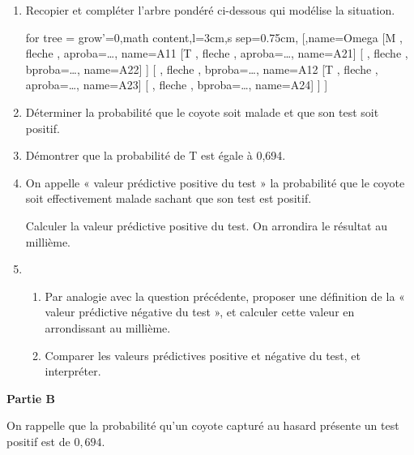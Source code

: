 \begin{enumerate}
	\item Recopier et compléter l’arbre pondéré ci-dessous qui modélise la situation.
	
	\begin{center}
		\begin{forest} for tree = {grow'=0,math content,l=3cm,s sep=0.75cm},
			[,name=Omega
				[M , fleche , aproba=\ldots , name=A11
					[T , fleche , aproba=\ldots , name=A21]
					[ , fleche , bproba=\ldots , name=A22]
				]
				[ , fleche , bproba=\ldots , name=A12
					[T , fleche , aproba=\ldots , name=A23]
					[ , fleche , bproba=\ldots , name=A24]
				]
			]
		\end{forest}
	\end{center}
	\item Déterminer la probabilité que le coyote soit malade et que son test soit positif.
	\item Démontrer que la probabilité de T est égale à 0,694.
	\item On appelle « valeur prédictive positive du test » la probabilité que le coyote soit effectivement  malade sachant que son test est positif.
	
	Calculer la valeur prédictive positive du test. On arrondira le résultat au millième.
	\item 
	\begin{enumerate}
		\item Par analogie avec la question précédente, proposer une définition de la « valeur prédictive négative du test », et calculer cette valeur en arrondissant au millième.
		\item Comparer les valeurs prédictives positive et négative du test, et interpréter.
	\end{enumerate}
\end{enumerate}
%
\begin{center}
	\textbf{Partie B}
\end{center}
%
On rappelle que la probabilité qu’un coyote capturé au hasard présente un test positif est de $0,694$.

